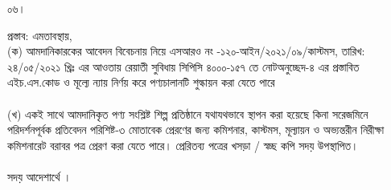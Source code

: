 \documentclass[12pt]{article}
\newcommand{\srooot}{এসআরও নং -১২০-আইন/২০২১/০৯/কাস্টমস}
\newcommand{\sroootd}{তারিখ: ২৪/০৫/২০২১ খ্রিঃ}
\begin{document}
\begin{minipage}[t]{0.05\linewidth}
০৬।
\end{minipage}
\begin{minipage}[t]{0.95\linewidth}
প্রস্তাব:
এমতাবস্থায়,
\\
(ক) আমদানিকারকের আবেদন বিবেচনায় নিয়ে
{\srooot}, {\sroootd} এর আওতায় রেয়াতী সুবিধায়
সিপিসি ৪০০০-১৫৭ তে নোটঅনুচ্ছেদ-৪ এর প্রস্তাবিত
এইচ.এস.কোড ও মূল্যে ন্যায় নির্ণয় করে পণ্যচালানটি
শুল্কায়ন করা যেতে পারে
\\
\\
(খ) একই সাথে আমদানিকৃত পণ্য সংশ্লিষ্ট শিল্প প্রতিষ্ঠানে
যথাযথভাবে স্থাপন করা হয়েছে কিনা সরেজমিনে
পরিদর্শনপূর্বক প্রতিবেদন পরিশিষ্ট-৩ মোতাবেক
প্রেরণের জন্য কমিশনার, কাস্টমস, মূল্যায়ন ও
অভ্যন্তরীন নিরীক্ষা কমিশনারেট বরাবর পত্র প্রেরণ করা যেতে পারে। প্রেরিতব্য পত্রের খসড়া / স্বচ্ছ কপি
সদয় উপস্থাপিত।
\\
\\
সদয় আদেশার্থে ।
\end{minipage}
\end{document}
